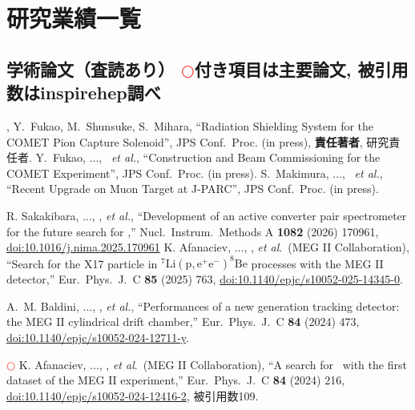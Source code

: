 
\section{研究業績一覧}
	
\subsection{学術論文（査読あり） \textcolor{red}{$\bigcirc$}付き項目は主要論文, 被引用数はinspirehep調べ}

	\begin{enumerate}
			\setlength{\itemsep}{-1pt}

        \me, Y.~Fukao, M.~Shunsuke, S.~Mihara, 
        ``Radiation Shielding System for the COMET Pion Capture Solenoid'', 
        JPS Conf.\ Proc. (in press), \textbf{ 責任著者}, 研究責任者.
         Y.~Fukao, ..., \me\ \textit{et al.}, 
        ``Construction and Beam Commissioning for the COMET Experiment'', 
        JPS Conf.\ Proc. (in press).
         S.~Makimura, ..., \me\ \textit{et al.}, 
        ``Recent Upgrade on Muon Target at J-PARC'', 
        JPS Conf.\ Proc. (in press).

R. Sakakibara, ..., \me, {\it et al.},
``Development of an active converter pair spectrometer for the future search for \megc,'' Nucl.\ Instrum.\ Methods A {\bf 1082} (2026) 170961,
\href{https://doi.org/10.1016/j.nima.2025.170961}{doi:10.1016/j.nima.2025.170961}
K. Afanaciev, ..., \me, {\it et al}.\ (MEG II Collaboration),
  ``Search for the X17 particle in $^{7}\textrm{Li}(\textrm{p},\textrm{e}^+ \textrm{e}^{-}) ^{8}\textrm{Be}$ processes with the MEG II detector,''
  Eur.\ Phys.\ J.\ C {\bf 85}  (2025) 763,
  \href{https://doi.org/10.1140/epjc/s10052-025-14345-0}{doi:10.1140/epjc/s10052-025-14345-0}.

A.~M. Baldini, ..., \me, {\it et al.},
``Performances of a new generation tracking detector: the MEG II cylindrical drift chamber,''
  Eur.\ Phys.\ J.\ C {\bf 84}  (2024) 473,
\href{https://doi.org/10.1140/epjc/s10052-024-12711-y}{doi:10.1140/epjc/s10052-024-12711-y}.

\textcolor{red}{$\bigcirc$} 
K. Afanaciev, ..., \me, {\it et al}.\ (MEG II Collaboration),
  ``A search for \megc\ with the first dataset of the MEG II experiment,''
  Eur.\ Phys.\ J.\ C {\bf 84}  (2024) 216,
  \href{https://doi.org/10.1140/epjc/s10052-024-12416-2}{doi:10.1140/epjc/s10052-024-12416-2},
  被引用数109.


\end{enumerate}
